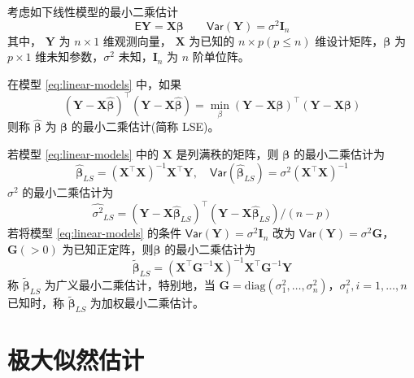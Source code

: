 \documentclass[12pt,a4paper,UTF8,twoside]{book}
\theoremstyle{definition}
\theoremstyle{definition}
\theoremstyle{definition}
\theoremstyle{remark}
\let\BeginKnitrBlock\begin \let\EndKnitrBlock\end
\begin{document}
考虑如下线性模型的最小二乘估计 \begin{equation}
\mathsf{E}\mathbf{Y} = \mathbf{X}\boldsymbol{\beta} \qquad \mathsf{Var}(\mathbf{Y}) = \sigma^2 \mathbf{I}_{n} \label{eq:linear-models}
\end{equation} \noindent 其中， \(\mathbf{Y}\) 为 \(n \times 1\)
维观测向量， \(\mathbf{X}\) 为已知的 \(n \times p (p \leq n)\)
维设计矩阵，\(\boldsymbol{\beta}\) 为 \(p \times 1\)
维未知参数，\(\sigma^2\) 未知，\(\mathbf{I}_{n}\) 为 \(n\) 阶单位阵。
\BeginKnitrBlock{definition}[最小二乘估计]
\protect\hypertarget{def:least-squares-estimate}{}{\label{def:least-squares-estimate}
{} }在模型 \eqref{eq:linear-models} 中，如果
\begin{equation}
(\mathbf{Y} - \mathbf{X}\hat{\boldsymbol{\beta}})^{\top}(\mathbf{Y} - \mathbf{X}\hat{\boldsymbol{\beta}}) = \min_{\beta}(\mathbf{Y} - \mathbf{X}\boldsymbol{\beta})^{\top}(\mathbf{Y} - \mathbf{X}\boldsymbol{\beta}) \label{eq:least-squares}
\end{equation} \noindent 则称 \(\hat{\boldsymbol{\beta}}\) 为
\(\boldsymbol{\beta}\) 的最小二乘估计(简称 LSE)\citep{wang2004}。
\EndKnitrBlock{definition}

\BeginKnitrBlock{theorem}[最小二乘估计]
\protect\hypertarget{thm:unbiased}{}{\label{thm:unbiased}
{} }若模型 \eqref{eq:linear-models} 中的
\(\mathbf{X}\) 是列满秩的矩阵，则 \(\boldsymbol{\beta}\)
的最小二乘估计为 \[
\hat{\boldsymbol{\beta}}_{LS} = ( \mathbf{X}^{\top}\mathbf{X} )^{-1}\mathbf{X}^{\top} \mathbf{Y}, \quad  \mathsf{Var}(\hat{\boldsymbol{\beta}}_{LS}) = \sigma^2 (\mathbf{X}^{\top}\mathbf{X})^{-1}  
\] \noindent \(\sigma^2\) 的最小二乘估计为 \[
\hat{\sigma^2}_{LS} = (\mathbf{Y} - \mathbf{X}\hat{\boldsymbol{\beta}}_{LS})^{\top}(\mathbf{Y} - \mathbf{X}\hat{\boldsymbol{\beta}}_{LS})/(n - p)
\] 若将模型 \eqref{eq:linear-models} 的条件
\(\mathsf{Var}(\mathbf{Y}) = \sigma^2 \mathbf{I}_{n}\) 改为
\(\mathsf{Var}(\mathbf{Y}) = \sigma^2 \mathbf{G}\)， \(\mathbf{G}(>0)\)
为已知正定阵，则\(\boldsymbol{\beta}\) 的最小二乘估计为 \[
\tilde{\boldsymbol{\beta}}_{LS} = ( \mathbf{X}^{\top} \mathbf{G}^{-1} \mathbf{X})^{-1} \mathbf{X}^{\top} \mathbf{G}^{-1} \mathbf{Y} 
\] \noindent 称 \(\tilde{\boldsymbol{\beta}}_{LS}\)
为广义最小二乘估计，特别地，当
\(\mathbf{G} = \mathrm{diag}(\sigma^2_{1},\ldots,\sigma^2_{n})\)，\(\sigma^2_{i},i = 1,\ldots,n\)
已知时，称 \(\tilde{\boldsymbol{\beta}}_{LS}\)
为加权最小二乘估计\citep{wang2004}。
\EndKnitrBlock{theorem}

\hypertarget{sec:def-mle}{%
\section{极大似然估计}\label{sec:def-mle}}
\end{document}
